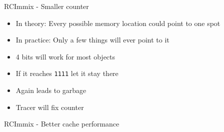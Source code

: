 \documentclass{beamer}
\begin{document}
\begin{frame}{RCImmix - Smaller counter}
	\begin{itemize}
		\item In theory: Every possible memory location could point to one spot
		\item In practice: Only a few things will ever point to it
		\item 4 bits will work for most objects
		\item If it reaches \texttt{1111} let it stay there
		\item Again leads to garbage
		\item Tracer will fix counter
	\end{itemize}
\end{frame}

\begin{frame}{RCImmix - Better cache performance}
	
\end{frame}
\end{document}
